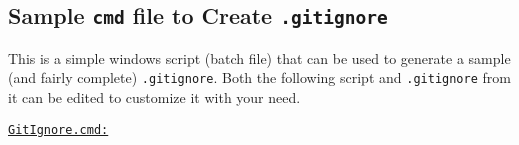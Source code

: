 \vspace*{\baselineskip}
\subsection{Sample \texttt{cmd} file to Create \texttt{.gitignore}}
This is a simple windows script (batch file) that can be used to generate a sample (and fairly complete) \texttt{.gitignore}. Both the following script  and \texttt{.gitignore} from it can be edited to customize it with your need.

	{\color{violet}
		\begin{singlespace}
			\nl \underline{\texttt{GitIgnore.cmd:}}
			{\footnotesize
				
			}
		\end{singlespace}
	}